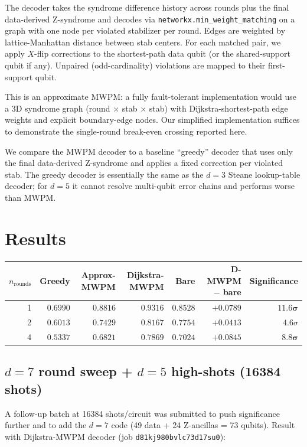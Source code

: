 \documentclass[11pt,letterpaper]{article}
\begin{document}
The decoder takes the syndrome difference history across rounds plus the final data-derived Z-syndrome and decodes via \texttt{networkx.min\_weight\_matching} on a graph with one node per violated stabilizer per round. Edges are weighted by lattice-Manhattan distance between stab centers. For each matched pair, we apply $X$-flip corrections to the shortest-path data qubit (or the shared-support qubit if any). Unpaired (odd-cardinality) violations are mapped to their first-support qubit.

This is an approximate MWPM: a fully fault-tolerant implementation would use a 3D syndrome graph (round × stab × stab) with Dijkstra-shortest-path edge weights and explicit boundary-edge nodes. Our simplified implementation suffices to demonstrate the single-round break-even crossing reported here.

We compare the MWPM decoder to a baseline ``greedy'' decoder that uses only the final data-derived Z-syndrome and applies a fixed correction per violated stab. The greedy decoder is essentially the same as the $d = 3$ Steane lookup-table decoder; for $d = 5$ it cannot resolve multi-qubit error chains and performs worse than MWPM.

\section{Results}

\begin{center}
\begin{tabular}{rrrrrrr}
\toprule
$n_{\mathrm{rounds}}$ & Greedy & Approx-MWPM & \textbf{Dijkstra-MWPM} & Bare & D-MWPM $-$ bare & Significance \\
\midrule
1 & $0.6990$ & $0.8816$ & $\bm{0.9316}$ & $0.8528$ & $\bm{+0.0789}$ & $\bm{11.6\sigma}$ \\
2 & $0.6013$ & $0.7429$ & $\bm{0.8167}$ & $0.7754$ & $\bm{+0.0413}$ & $4.6\sigma$ \\
4 & $0.5337$ & $0.6821$ & $\bm{0.7869}$ & $0.7024$ & $\bm{+0.0845}$ & $\bm{8.8\sigma}$ \\
\bottomrule
\end{tabular}
\end{center}

\subsection{$d = 7$ round sweep + $d = 5$ high-shots (16384 shots)}

A follow-up batch at 16384 shots/circuit was submitted to push significance further and to add the $d = 7$ code (49 data + 24 Z-ancillas = 73 qubits). Result with Dijkstra-MWPM decoder (job \texttt{d81kj980bvlc73d17su0}):
\end{document}
